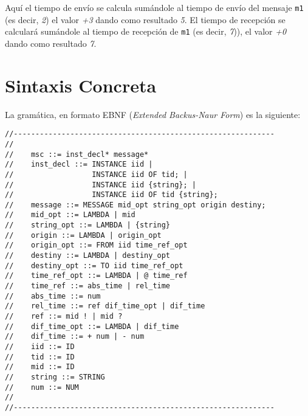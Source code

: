 \begin{itemize}

  Aquí el tiempo de envío se calcula sumándole al tiempo de envío del
  mensaje \lstinline{m1} (es decir, \textit{2}) el valor \textit{+3}
  dando como resultado \textit{5}. El tiempo de recepción se calculará
  sumándole al tiempo de recepción de \lstinline{m1} (es decir,
  \textit{7})), el valor \textit{+0} dando como resultado \textit{7}.
\end{itemize}

\section{Sintaxis Concreta}

La gramática, en formato EBNF (\emph{Extended Backus-Naur Form}) es la siguiente:
\begin{verbatim}
//------------------------------------------------------------
//    
//    msc ::= inst_decl* message*
//    inst_decl ::= INSTANCE iid |
//                  INSTANCE iid OF tid; |
//                  INSTANCE iid {string}; |
//                  INSTANCE iid OF tid {string};               
//    message ::= MESSAGE mid_opt string_opt origin destiny;
//    mid_opt ::= LAMBDA | mid
//    string_opt ::= LAMBDA | {string}
//    origin ::= LAMBDA | origin_opt
//    origin_opt ::= FROM iid time_ref_opt
//    destiny ::= LAMBDA | destiny_opt
//    destiny_opt ::= TO iid time_ref_opt
//    time_ref_opt ::= LAMBDA | @ time_ref
//    time_ref ::= abs_time | rel_time
//    abs_time ::= num
//    rel_time ::= ref dif_time_opt | dif_time
//    ref ::= mid ! | mid ?
//    dif_time_opt ::= LAMBDA | dif_time
//    dif_time ::= + num | - num
//    iid ::= ID
//    tid ::= ID
//    mid ::= ID
//    string ::= STRING
//    num ::= NUM
//
//------------------------------------------------------------
\end{verbatim}


